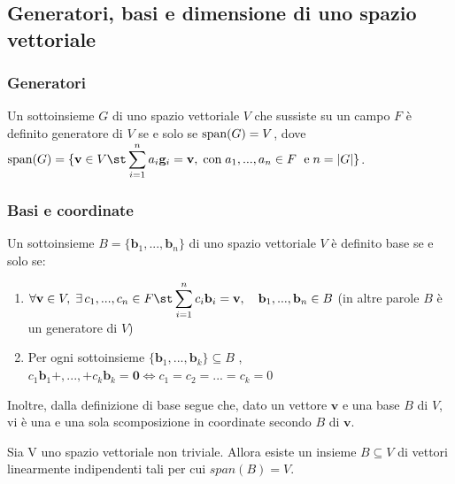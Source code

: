 \vspace{10pt}
\subsection{Generatori, basi e dimensione di uno spazio vettoriale} \label{subsec:vsgenerators}
    \subsubsection{Generatori}
    Un sottoinsieme $G$ di uno spazio vettoriale $V$ che sussiste su un campo $F$ è definito generatore di $V$ se e solo se $\textnormal{span}(G) = V$, dove $\textnormal{span}(G) = \{\mathbf{v} \in V \st \displaystyle\sum_{i = 1}^{n} a_i \mathbf{g}_{i} = \mathbf{v}, \; \textnormal{con} \; a_1, ..., a_{n} \in F\ \; \textnormal{e} \; n = |G|\}$.

    \subsubsection{Basi e coordinate}
    Un sottoinsieme $B = \{\mathbf{b}_{1},...,\mathbf{b}_{n}\}$ di uno spazio vettoriale $V$ è definito base se e solo se:
    \begin{enumerate}[label=(\arabic*)]
        \item $ \forall \mathbf{v} \in V, \; \exists \, c_1, ..., c_n \in F \st \displaystyle\sum_{i = 1}^{n} c_i \mathbf{b}_{i} = \mathbf{v}, \quad \mathbf{b}_{1}, ..., \mathbf{b}_{n} \in B$ (in altre parole $B$ è un generatore di $V$)
        \item Per ogni sottoinsieme $\{\mathbf{b}_{1}, ..., \mathbf{b}_{k}\} \subseteq B$ , $c_1 \mathbf{b}_{1} + , ..., + c_k \mathbf{b}_{k} = \mathbf{0} \iff c_1 = c_2 = ... = c_k = 0 $
    \end{enumerate}

    Inoltre, dalla definizione di base segue che, dato un vettore $\mathbf{v}$ e una base $B$ di $V$, vi è una e una sola scomposizione in coordinate secondo $B$ di $\mathbf{v}$.

    \newpage
    \begin{theorem}
        Sia V uno spazio vettoriale non triviale. Allora esiste un insieme $B \subseteq V$ di vettori linearmente indipendenti tali per cui $span(B) = V$.
    \end{theorem}

